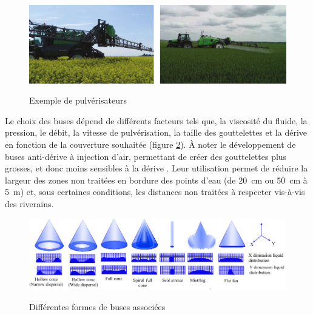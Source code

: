 \documentclass[../thesis.tex]{subfiles}
\begin{document}
    \begin{figure}[H]
        \centering
        \includegraphics[width=0.6\linewidth]{img/intro/rampe-epandage} \\
        \caption{Exemple de pulvérisateurs}
        \label{fig:02-epandage}
    \end{figure}
    
    Le choix des buses dépend de différents facteurs tels que, la viscosité du fluide, la pression, le débit, la vitesse de pulvérisation, la taille des gouttelettes et la dérive en fonction de la couverture souhaitée (figure \ref{fig:02-buses}). À noter le développement de buses anti-dérive à injection d'air, permettant de créer des gouttelettes plus grosses, et donc moins sensibles à la dérive \cite{vulga2015}. Leur utilisation permet de réduire la largeur des zones non traitées en bordure des points d'eau (de \SI{20}{\cm} ou \SI{50}{\cm} à \SI{5}{\meter}) et, sous certaines conditions, les distances non traitées à respecter vis-à-vis des riverains.
    
    \begin{figure}[H]
        \centering
        
        \includegraphics[width=\linewidth]{img/intro/spray-pattern-distributions.jpg} \\
        \caption{Différentes formes de buses associées}
        \label{fig:02-buses}
    \end{figure}
    
\end{document}

